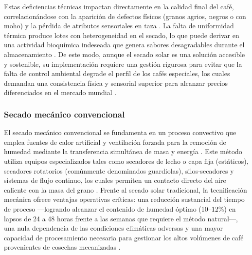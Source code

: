 Estas deficiencias técnicas impactan directamente en la calidad final del café, correlacionándose con la aparición de defectos físicos (granos agrios, negros o con moho) y la pérdida de atributos sensoriales en taza \parencite{firdissa_coffee_2022, huaman-murillo_physical_2024}. La falta de uniformidad térmica produce lotes con heterogeneidad en el secado, lo que puede derivar en una actividad bioquímica indeseada que genera sabores desagradables durante el almacenamiento \parencite{guevara-sanchez_effect_2019, huaman-murillo_physical_2024}. De este modo, aunque el secado solar es una solución accesible y sostenible, su implementación requiere una gestión rigurosa para evitar que la falta de control ambiental degrade el perfil de los cafés especiales, los cuales demandan una consistencia física y sensorial superior para alcanzar precios diferenciados en el mercado mundial \parencite{guevara-sanchez_effect_2019, huaman-murillo_physical_2024}.

\subsubsection{Secado mecánico convencional}

El secado mecánico convencional se fundamenta en un proceso convectivo que emplea fuentes de calor artificial y ventilación forzada para la remoción de humedad mediante la transferencia simultánea de masa y energía \parencite{abreu_influence_2025, coradi_development_2021, largo-avila_influence_2023}. Este método utiliza equipos especializados tales como secadores de lecho o capa fija (estáticos), secadores rotatorios (comúnmente denominados guardiolas), silos-secadores y sistemas de flujo continuo, los cuales permiten un contacto directo del aire caliente con la masa del grano \parencite{alves_physiological_2017, coradi_development_2021, leonardo_barcelos_mateus_modeling_2021, prada_efectividad_2019, sandeep_effect_2021}. Frente al secado solar tradicional, la tecnificación mecánica ofrece ventajas operativas críticas: una reducción sustancial del tiempo de proceso —logrando alcanzar el contenido de humedad óptimo (10--12\%) en lapsos de 24 a 48 horas frente a las semanas que requiere el método natural—, una nula dependencia de las condiciones climáticas adversas y una mayor capacidad de procesamiento necesaria para gestionar los altos volúmenes de café provenientes de cosechas mecanizadas \parencite{abreu_influence_2025, alves_physiological_2017, largo-avila_influence_2023, sandeep_effect_2021}.

